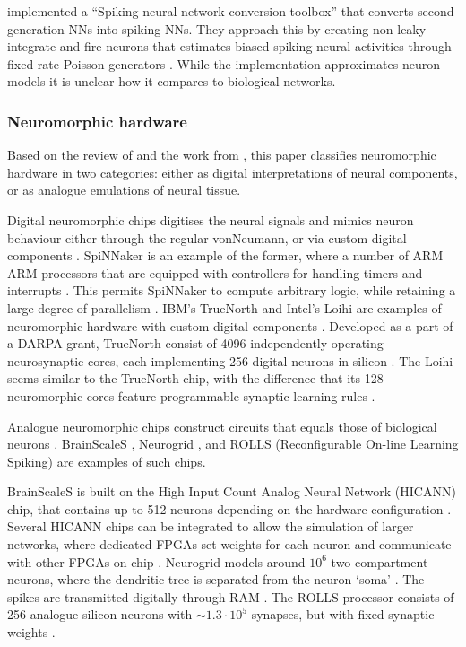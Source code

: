 \documentclass[report.tex]{subfiles}
\begin{document}
\textcite{Rueckauer2017} implemented a ``Spiking neural network conversion
toolbox'' that converts second generation \gls{NN}s into
spiking \gls{NN}s.
They approach this by creating non-leaky integrate-and-fire
 neurons that estimates biased spiking neural activities through
fixed rate Poisson generators
\cite{Rueckauer2017}.
While the implementation approximates neuron models it is unclear
how it compares to biological networks.

\subsubsection{Neuromorphic hardware} \label{sec:similar-neuromorphic}
Based on the review of \textcite{Walter2015} and the work from
\cite{Lin2018}, this paper classifies neuromorphic hardware in two
categories: either as digital interpretations of neural components, 
or as analogue emulations of neural tissue.

Digital neuromorphic chips digitises the neural signals and mimics neuron
behaviour either through the regular \gls{vonNeumann}, or
via custom digital components \cite{Walter2015}.
SpiNNaker is an example of the former, where a number of ARM \gls{ARM}
processors that are equipped with controllers for handling timers and
interrupts \cite{Walter2015}.
This permits SpiNNaker to compute arbitrary logic, while retaining
a large degree of parallelism \cite{Albada2018}.
IBM's TrueNorth  and Intel's Loihi 
are examples of neuromorphic hardware with custom digital components 
\cite{Walter2015, Lin2018}.
Developed as a part of a \gls{DARPA} grant, TrueNorth consist of 4096
independently operating neurosynaptic cores, each implementing 256
digital neurons in silicon \cite{Walter2015, ArtificialBrains2018}.
The Loihi seems similar to the TrueNorth chip, with the difference that
its 128 neuromorphic cores feature programmable
synaptic learning rules \cite{Lin2018}.

Analogue neuromorphic chips construct circuits that equals those of biological
neurons \cite{Walter2015}.
BrainScaleS \cite{Schmitt2017}, Neurogrid \cite{BrainsInSilicon2018}, 
and ROLLS (Reconfigurable On-line Learning Spiking)
\cite{Walter2015} are examples of such chips.

BrainScaleS is built on the High Input Count Analog Neural Network (HICANN)
chip, that contains up to 512 neurons depending on the hardware configuration 
\cite{Pfeil2013}.
Several HICANN chips can be integrated to allow the simulation of larger
networks, where dedicated \gls{FPGA}s set weights for each neuron and
communicate with other FPGAs on chip \cite{Walter2015}. 
Neurogrid models around $10^6$ two-compartment neurons, where the dendritic
tree is separated from the neuron `soma' \cite{Walter2015}.
The spikes are transmitted digitally through \gls{RAM} \cite{Walter2015}.
The ROLLS processor consists of 256 analogue silicon neurons with
$\sim1.3 \cdot 10^5$ synapses, but with fixed synaptic weights
\cite{Walter2015}.
\end{document}
